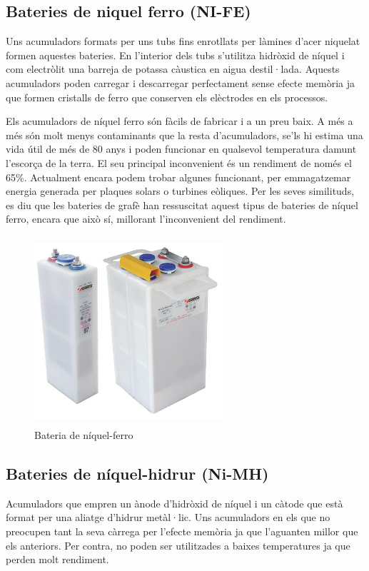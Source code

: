 \subsection{Bateries de niquel ferro (NI-FE)}
Uns acumuladors formats per uns tubs fins enrotllats per làmines d’acer niquelat formen aquestes bateries. En l’interior dels tubs s’utilitza hidròxid de níquel i com electròlit una barreja de potassa càustica en aigua destil·lada. Aquests acumuladors poden carregar i descarregar perfectament sense efecte memòria ja que formen cristalls de ferro que conserven els elèctrodes en els processos. 

Els acumuladors de níquel ferro són fàcils de fabricar i a un preu baix. A més a més són molt menys contaminants que la resta d’acumuladors, se'ls hi estima una vida útil de més de 80 anys i poden funcionar en qualsevol temperatura damunt l'escorça de la terra. El seu principal inconvenient és un rendiment de només el 65\%. Actualment encara podem trobar algunes funcionant, per emmagatzemar energia generada per plaques solars o turbines eòliques. Per les seves similituds, es diu que les bateries de grafè han ressuscitat aquest tipus de bateries de níquel ferro, encara que això sí, millorant l’inconvenient del rendiment.
\bigskip
\begin{figure}[H]
	\centering
    \includegraphics[width=7cm, height=7cm] {Bateries/niquelferro.jpg}
    \caption{Bateria de níquel-ferro}
\end{figure}
\newpage

\subsection{Bateries de níquel-hidrur (Ni-MH)}
Acumuladors que empren un ànode d’hidròxid de níquel i un càtode que està format per una aliatge d’hidrur metàl·lic. Uns acumuladors en els que no preocupen tant la seva càrrega per l’efecte memòria ja que l’aguanten millor que els anteriors. Per contra, no poden ser utilitzades a baixes temperatures ja que perden molt rendiment.

